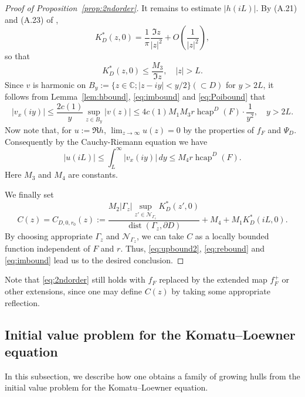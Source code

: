 \documentclass[preprint,12pt]{elsarticle}
\theoremstyle{definition}
\newcommand{\C}{\mathbb{C}}
\DeclareMathOperator{\dist}{dist}
\DeclareMathOperator{\hcap}{hcap}
\begin{document}
\begin{proof}[Proof of Proposition~\ref{prop:2ndorder}]
It remains to estimate $\lvert h(iL) \rvert$.
By (A.21) and (A.23) of \cite{CF18},
\[
K^*_D(z,0)=\frac{1}{\pi}\frac{\Im z}{\lvert z \rvert^2}
	+ O\left(\frac{1}{\lvert z \rvert^2}\right),
\]
so that
\begin{equation} \label{eq:Poibound}
K^*_D(z,0) \leq \frac{M_3}{\Im z}, \quad \lvert z \rvert >L.
\end{equation}
Since $v$ is harmonic on $B_y:=\{z \in \C; \lvert z-iy \rvert < y/2\} (\subset D)$
for $y>2L$, it follows from Lemma~\ref{lem:hbound}, \eqref{eq:imbound}
and \eqref{eq:Poibound} that
\[
\lvert v_x(iy) \rvert \leq \frac{2c(1)}{y}\sup_{z \in B_y}\lvert v(z) \rvert
\leq 4c(1)M_1M_3r\hcap^D(F) \cdot \frac{1}{y^2}, \quad y>2L.
\]
Now note that, for $u:=\Re h$, $\lim_{z \to \infty} u(z)=0$
by the properties of $f_F$ and $\Psi_D$.
Consequently by the Cauchy-Riemann equation we have
\begin{equation} \label{eq:rebound}
\lvert u(iL) \rvert \leq \int_L^{\infty}\lvert v_x(iy) \rvert\,dy \leq M_4r\hcap^D(F).
\end{equation}
Here $M_3$ and $M_4$ are constants.

We finally set
\begin{equation} \label{eq:2ndconst}
C(z)=C_{D, 0, r_0}(z)
:=\frac{M_2\lvert \Gamma_z \rvert \sup_{z' \in \mathcal{N}_{\Gamma_z}} K^*_D(z',0)}
{\dist(\Gamma_z, \partial D)}+M_4+M_1K^*_D(iL, 0).
\end{equation}
By choosing appropriate $\Gamma_z$ and $\mathcal{N}_{\Gamma_z}$,
we can take $C$ as a locally bounded function independent of $F$ and $r$.
Thus, \eqref{eq:upbound2}, \eqref{eq:rebound} and \eqref{eq:imbound}
lead us to the desired conclusion.
\end{proof}

Note that \eqref{eq:2ndorder} still holds
with $f_F$ replaced by the extended map $f^+_F$ or other extensions,
since one may define $C(z)$ by taking some appropriate reflection.

\subsection{Initial value problem for the Komatu--Loewner equation}
\label{subsec:initKL}

In this subsection, we describe how one obtains a family of growing hulls
from the initial value problem for the Komatu--Loewner equation.
\end{document}
